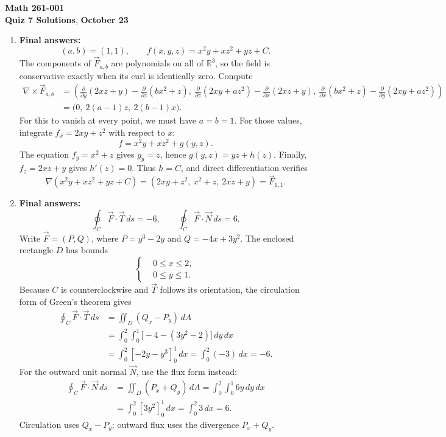 \documentclass[12pt]{exam}
\newcommand{\class}{Math 261-001}
\newcommand{\examnum}{Quiz 7 Solutions}
\newcommand{\examdate}{October 23}
\begin{document}
\pagestyle{plain}
\thispagestyle{empty}

\noindent
\textbf{\class}\\
\textbf{\examnum}, \textbf{\examdate}

\vspace{8pt}
\small
\setlength{\abovedisplayskip}{6pt}
\setlength{\belowdisplayskip}{6pt}
\setlength{\abovedisplayshortskip}{3pt}
\setlength{\belowdisplayshortskip}{6pt}
\begin{enumerate}

\item \textbf{Final answers:}
\[
  \boxed{(a,b)=(1,1)},\qquad
  \boxed{f(x,y,z)=x^2y+xz^2+yz+C}.
\]
The components of $\vec F_{a,b}$ are polynomials on all of
$\mathbb R^3$, so the field is conservative exactly when its curl is
identically zero. Compute
\[
\begin{aligned}
  \nabla\times\vec F_{a,b}
  &=\left(
     \frac{\partial}{\partial y}(2xz+y)
       -\frac{\partial}{\partial z}(bx^2+z),\
     \frac{\partial}{\partial z}(2xy+az^2)
       -\frac{\partial}{\partial x}(2xz+y),\
     \frac{\partial}{\partial x}(bx^2+z)
       -\frac{\partial}{\partial y}(2xy+az^2)
     \right)\\
  &=\bigl(0,\ 2(a-1)z,\ 2(b-1)x\bigr).
\end{aligned}
\]
For this to vanish at every point, we must have $a=b=1$.
For those values, integrate $f_x=2xy+z^2$ with respect to $x$:
\[
  f=x^2y+xz^2+g(y,z).
\]
The equation $f_y=x^2+z$ gives $g_y=z$, hence
$g(y,z)=yz+h(z)$. Finally, $f_z=2xz+y$ gives $h'(z)=0$.
Thus $h=C$, and direct differentiation verifies
\[
  \nabla(x^2y+xz^2+yz+C)
    =(2xy+z^2,\ x^2+z,\ 2xz+y)=\vec F_{1,1}.
\]

\medskip
\item \textbf{Final answers:}
\[
  \boxed{\displaystyle\oint_C\vec F\cdot\vec T\,ds=-6},\qquad
  \boxed{\displaystyle\oint_C\vec F\cdot\vec N\,ds=6}.
\]
Write $\vec F=(P,Q)$, where $P=y^3-2y$ and $Q=-4x+3y^2$.
The enclosed rectangle $D$ has bounds
\[
  \left\{
  \begin{aligned}
    &0\leq x\leq2,\\
    &0\leq y\leq1.
  \end{aligned}
  \right.
\]
Because $C$ is counterclockwise and $\vec T$ follows its orientation,
the circulation form of Green's theorem gives
\[
\begin{aligned}
  \oint_C\vec F\cdot\vec T\,ds
    &=\iint_D(Q_x-P_y)\,dA\\
    &=\int_0^2\int_0^1\bigl[-4-(3y^2-2)\bigr]\,dy\,dx\\
    &=\int_0^2[-2y-y^3]_0^1\,dx
     =\int_0^2(-3)\,dx=-6.
\end{aligned}
\]
For the outward unit normal $\vec N$, use the flux form instead:
\[
\begin{aligned}
  \oint_C\vec F\cdot\vec N\,ds
    &=\iint_D(P_x+Q_y)\,dA
      =\int_0^2\int_0^1 6y\,dy\,dx\\
    &=\int_0^2[3y^2]_0^1\,dx
     =\int_0^2 3\,dx=6.
\end{aligned}
\]
Circulation uses $Q_x-P_y$; outward flux uses the divergence $P_x+Q_y$.


\end{enumerate}
\end{document}
